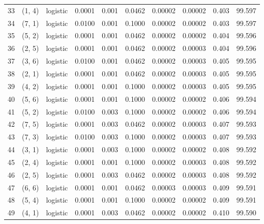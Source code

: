 \begin{tabular}{lllrrrrrrr}
33  &      (1, 4) &  logistic &  0.0001 &  0.001 &  0.0462 &          0.00002 &    0.00002 &       0.403 &    99.597 \\
34  &      (7, 1) &  logistic &  0.0100 &  0.001 &  0.1000 &          0.00002 &    0.00002 &       0.403 &    99.597 \\
35  &      (5, 2) &  logistic &  0.0001 &  0.001 &  0.0462 &          0.00002 &    0.00002 &       0.404 &    99.596 \\
36  &      (2, 5) &  logistic &  0.0001 &  0.001 &  0.0462 &          0.00002 &    0.00003 &       0.404 &    99.596 \\
37  &      (3, 6) &  logistic &  0.0100 &  0.001 &  0.0462 &          0.00002 &    0.00003 &       0.405 &    99.595 \\
38  &      (2, 1) &  logistic &  0.0001 &  0.001 &  0.0462 &          0.00002 &    0.00003 &       0.405 &    99.595 \\
39  &      (4, 2) &  logistic &  0.0001 &  0.001 &  0.1000 &          0.00002 &    0.00003 &       0.405 &    99.595 \\
40  &      (5, 6) &  logistic &  0.0001 &  0.001 &  0.1000 &          0.00002 &    0.00002 &       0.406 &    99.594 \\
41  &      (5, 2) &  logistic &  0.0100 &  0.003 &  0.1000 &          0.00002 &    0.00002 &       0.406 &    99.594 \\
42  &      (7, 5) &  logistic &  0.0001 &  0.003 &  0.0462 &          0.00002 &    0.00003 &       0.407 &    99.593 \\
43  &      (7, 3) &  logistic &  0.0100 &  0.003 &  0.1000 &          0.00002 &    0.00003 &       0.407 &    99.593 \\
44  &      (3, 1) &  logistic &  0.0001 &  0.003 &  0.1000 &          0.00002 &    0.00002 &       0.408 &    99.592 \\
45  &      (2, 4) &  logistic &  0.0001 &  0.001 &  0.1000 &          0.00002 &    0.00003 &       0.408 &    99.592 \\
46  &      (2, 5) &  logistic &  0.0001 &  0.003 &  0.0462 &          0.00002 &    0.00003 &       0.408 &    99.592 \\
47  &      (6, 6) &  logistic &  0.0001 &  0.001 &  0.0462 &          0.00003 &    0.00003 &       0.409 &    99.591 \\
48  &      (5, 4) &  logistic &  0.0001 &  0.001 &  0.1000 &          0.00002 &    0.00002 &       0.409 &    99.591 \\
49  &      (4, 1) &  logistic &  0.0001 &  0.003 &  0.0462 &          0.00002 &    0.00002 &       0.410 &    99.590 \\

\end{tabular}
